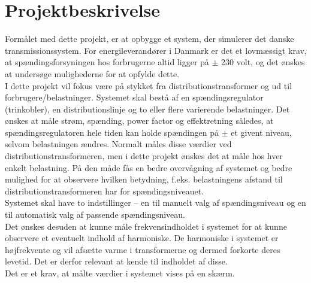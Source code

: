 
\chapter{Projektbeskrivelse}

Formålet med dette projekt, er at opbygge et system, der simulerer det danske transmissionssystem. For energileverandører i Danmark er det et lovmæssigt krav, at spændingsforsyningen hos forbrugerne altid ligger på $\pm$ 230 volt, og det ønskes at undersøge mulighederne for at opfylde dette.\\ 
I dette projekt vil fokus være på stykket fra distributionstransformer og ud til forbrugere/belastninger. Systemet skal bestå af en spændingsregulator (trinkobler), en distributionslinje og to eller flere varierende belastninger. Det ønskes at måle strøm, spænding, power factor og effektretning således, at spændingsregulatoren hele tiden kan holde spændingen på $\pm$ et givent niveau, selvom belastningen ændres. Normalt måles disse værdier ved distributionstransformeren, men i dette projekt ønskes det at måle hos hver enkelt belastning. På den måde fås en bedre overvågning af systemet og bedre mulighed for at observere hvilken betydning, f.eks. belastningens afstand til distributionstransformeren har for spændingsniveauet.\\ Systemet skal have to indstillinger – en til manuelt valg af spændingsniveau og en til automatisk valg af passende spændingsniveau.\\ 
Det ønskes desuden at kunne måle frekvensindholdet i systemet for at kunne observere et eventuelt indhold af harmoniske. De harmoniske i systemet er højfrekvente og vil afsætte varme i transformerne og dermed forkorte deres levetid. Det er derfor relevant at kende til indholdet af disse.\\ 
Det er et krav, at målte værdier i systemet vises på en skærm. 

